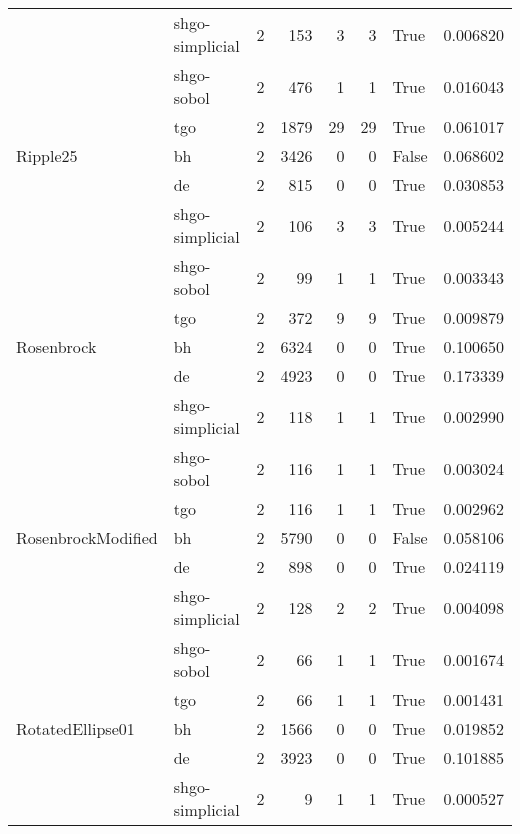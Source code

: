 \begin{longtable}{llrrrrlr}
         & shgo-simplicial &     2 &      153 &      3 &       3 &    True &    0.006820 \\
         & shgo-sobol &     2 &      476 &      1 &       1 &    True &    0.016043 \\
         & tgo &     2 &     1879 &     29 &      29 &    True &    0.061017 \\
Ripple25 & bh &     2 &     3426 &      0 &       0 &   False &    0.068602 \\
         & de &     2 &      815 &      0 &       0 &    True &    0.030853 \\
         & shgo-simplicial &     2 &      106 &      3 &       3 &    True &    0.005244 \\
         & shgo-sobol &     2 &       99 &      1 &       1 &    True &    0.003343 \\
         & tgo &     2 &      372 &      9 &       9 &    True &    0.009879 \\
Rosenbrock & bh &     2 &     6324 &      0 &       0 &    True &    0.100650 \\
         & de &     2 &     4923 &      0 &       0 &    True &    0.173339 \\
         & shgo-simplicial &     2 &      118 &      1 &       1 &    True &    0.002990 \\
         & shgo-sobol &     2 &      116 &      1 &       1 &    True &    0.003024 \\
         & tgo &     2 &      116 &      1 &       1 &    True &    0.002962 \\
RosenbrockModified & bh &     2 &     5790 &      0 &       0 &   False &    0.058106 \\
         & de &     2 &      898 &      0 &       0 &    True &    0.024119 \\
         & shgo-simplicial &     2 &      128 &      2 &       2 &    True &    0.004098 \\
         & shgo-sobol &     2 &       66 &      1 &       1 &    True &    0.001674 \\
         & tgo &     2 &       66 &      1 &       1 &    True &    0.001431 \\
RotatedEllipse01 & bh &     2 &     1566 &      0 &       0 &    True &    0.019852 \\
         & de &     2 &     3923 &      0 &       0 &    True &    0.101885 \\
         & shgo-simplicial &     2 &        9 &      1 &       1 &    True &    0.000527 \\

\end{longtable}
